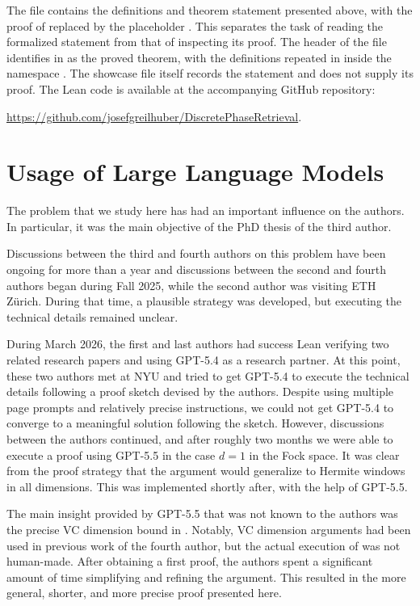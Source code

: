 \documentclass[11pt]{amsart}
\begin{document}
The file  contains the definitions and theorem statement
presented above, with the proof of  replaced by the
placeholder . This separates the task of reading the formalized
statement from that of inspecting its proof. The header of the file identifies
 in  as the proved
theorem, with the definitions repeated in  inside the
namespace . The showcase file itself records the statement
and does not supply its proof. The Lean code is available at the accompanying GitHub repository:
\begin{center}   \url{https://github.com/josefgreilhuber/DiscretePhaseRetrieval}.
\end{center}

\section*{Usage of Large Language Models}

The problem that we study here has had an important influence on the authors. In particular, it was the main objective of the PhD thesis of the third author. 

Discussions between the third and fourth authors on this problem have been ongoing for more than a year and discussions between the second and fourth authors began during Fall 2025, while the second author was visiting ETH Zürich. During that
time, a plausible strategy was developed, but executing the technical details remained unclear.

During March 2026, the first and last authors had success Lean verifying two related research papers \cite{abdalla2026stable,bertolini20262} and using GPT-5.4 as a research partner.
At this point, these two authors met at NYU and tried to get GPT-5.4 to execute the technical details following a proof sketch devised by the authors.
Despite using multiple page prompts and relatively precise instructions, we could not get GPT-5.4 to converge to a meaningful solution following the sketch.
However, discussions between the authors continued, and after roughly two months we were able to execute a proof using GPT-5.5 in the case $d=1$ in the Fock space. It was clear from the proof strategy that the argument would generalize to Hermite windows in all dimensions. This was implemented shortly after,
with the help of GPT-5.5. 

The main insight provided by GPT-5.5 that was not known to the authors was the precise VC dimension bound in . Notably, VC dimension
arguments had been used in previous work \cite{abdalla2025sharp} of the fourth author, but the actual execution of   was not human-made. After obtaining a first proof, the authors spent a significant amount of time simplifying and refining the argument. This resulted in the more general, shorter, and more precise proof presented here.
\end{document}
